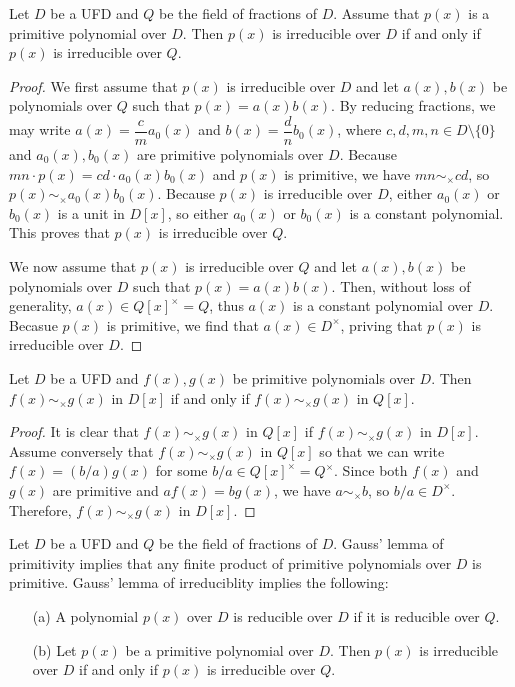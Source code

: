 \begin{thm}
    Let $D$ be a UFD and $Q$ be the field of fractions of $D$.
    Assume that $p(x)$ is a primitive polynomial over $D$.
    Then $p(x)$ is irreducible over $D$ if and only if $p(x)$ is irreducible over $Q$.
\end{thm}
\begin{proof}
    We first assume that $p(x)$ is irreducible over $D$ and let $a(x), b(x)$ be polynomials over $Q$ such that $p(x)=a(x)b(x)$.
    By reducing fractions, we may write $a(x)=\dfrac{c}{m}a_0(x)$ and $b(x)=\dfrac{d}{n}b_0(x)$, where $c, d, m, n\in D\setminus\{0\}$ and $a_0(x), b_0(x)$ are primitive polynomials over $D$.
    Because $mn\cdot p(x)=cd\cdot a_0(x)b_0(x)$ and $p(x)$ is primitive, we have $mn\sim_\times cd$, so $p(x)\sim_\times a_0(x)b_0(x)$.
    Because $p(x)$ is irreducible over $D$, either $a_0(x)$ or $b_0(x)$ is a unit in $D[x]$, so either $a_0(x)$ or $b_0(x)$ is a constant polynomial.
    This proves that $p(x)$ is irreducible over $Q$.

    We now assume that $p(x)$ is irreducible over $Q$ and let $a(x), b(x)$ be polynomials over $D$ such that $p(x)=a(x)b(x)$.
    Then, without loss of generality, $a(x)\in Q[x]^\times=Q$, thus $a(x)$ is a constant polynomial over $D$.
    Becasue $p(x)$ is primitive, we find that $a(x)\in D^\times$, priving that $p(x)$ is irreducible over $D$.
\end{proof}

\begin{cor}
    Let $D$ be a UFD and $f(x), g(x)$ be primitive polynomials over $D$.
    Then $f(x)\sim_\times g(x)$ in $D[x]$ if and only if $f(x)\sim_\times g(x)$ in $Q[x]$.
\end{cor}
\begin{proof}
    It is clear that $f(x)\sim_\times g(x)$ in $Q[x]$ if $f(x)\sim_\times g(x)$ in $D[x]$.
    Assume conversely that $f(x)\sim_\times g(x)$ in $Q[x]$ so that we can write $f(x)=(b/a)g(x)$ for some $b/a\in Q[x]^\times=Q^\times$.
    Since both $f(x)$ and $g(x)$ are primitive and $af(x)=bg(x)$, we have $a\sim_\times b$, so $b/a\in D^\times$.
    Therefore, $f(x)\sim_\times g(x)$ in $D[x]$.
\end{proof}

\begin{rmk}
    Let $D$ be a UFD and $Q$ be the field of fractions of $D$.
    Gauss' lemma of primitivity implies that any finite product of primitive polynomials over $D$ is primitive.
    Gauss' lemma of irreduciblity implies the following:
    \begin{enumerate}
        \item[(a)]
        {
            A polynomial $p(x)$ over $D$ is reducible over $D$ if it is reducible over $Q$.
        }
        \item[(b)]
        {
            Let $p(x)$ be a primitive polynomial over $D$.
            Then $p(x)$ is irreducible over $D$ if and only if $p(x)$ is irreducible over $Q$.
        }
    \end{enumerate}
\end{rmk}

